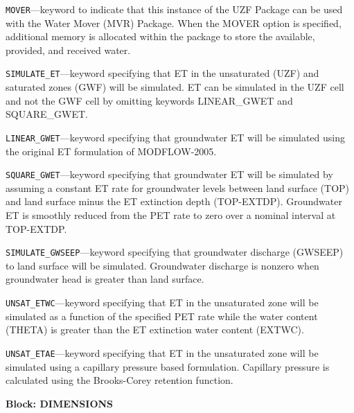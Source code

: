 \begin{description}
\item \texttt{MOVER}---keyword to indicate that this instance of the UZF Package can be used with the Water Mover (MVR) Package.  When the MOVER option is specified, additional memory is allocated within the package to store the available, provided, and received water.

\item \texttt{SIMULATE\_ET}---keyword specifying that ET in the unsaturated (UZF) and saturated zones (GWF) will be simulated. ET can be simulated in the UZF cell and not the GWF cell by omitting keywords LINEAR\_GWET and SQUARE\_GWET.

\item \texttt{LINEAR\_GWET}---keyword specifying that groundwater ET will be simulated using the original ET formulation of MODFLOW-2005.

\item \texttt{SQUARE\_GWET}---keyword specifying that groundwater ET will be simulated by assuming a constant ET rate for groundwater levels between land surface (TOP) and land surface minus the ET extinction depth (TOP-EXTDP). Groundwater ET is smoothly reduced from the PET rate to zero over a nominal interval at TOP-EXTDP.

\item \texttt{SIMULATE\_GWSEEP}---keyword specifying that groundwater discharge (GWSEEP) to land surface will be simulated. Groundwater discharge is nonzero when groundwater head is greater than land surface.

\item \texttt{UNSAT\_ETWC}---keyword specifying that ET in the unsaturated zone will be simulated as a function of the specified PET rate while the water content (THETA) is greater than the ET extinction water content (EXTWC).

\item \texttt{UNSAT\_ETAE}---keyword specifying that ET in the unsaturated zone will be simulated using a capillary pressure based formulation. Capillary pressure is calculated using the Brooks-Corey retention function.

\end{description}
\item \textbf{Block: DIMENSIONS}

